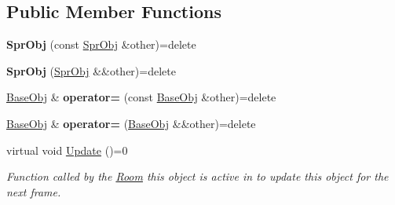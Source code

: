 \subsection*{Public Member Functions}
\begin{DoxyCompactItemize}
\item 
\hypertarget{class_helios_1_1_spr_obj_ab803d71e66b25686f4d6a29c1f3ee0d6}{}{\bfseries Spr\+Obj} (const \hyperlink{class_helios_1_1_spr_obj}{Spr\+Obj} \&other)=delete\label{class_helios_1_1_spr_obj_ab803d71e66b25686f4d6a29c1f3ee0d6}

\item 
\hypertarget{class_helios_1_1_spr_obj_ab0a6136a689b13a5ab16270df52a303a}{}{\bfseries Spr\+Obj} (\hyperlink{class_helios_1_1_spr_obj}{Spr\+Obj} \&\&other)=delete\label{class_helios_1_1_spr_obj_ab0a6136a689b13a5ab16270df52a303a}

\item 
\hypertarget{class_helios_1_1_spr_obj_a89e23d41b2a2b4262ed68b9c81cdbe42}{}\hyperlink{class_helios_1_1_base_obj}{Base\+Obj} \& {\bfseries operator=} (const \hyperlink{class_helios_1_1_base_obj}{Base\+Obj} \&other)=delete\label{class_helios_1_1_spr_obj_a89e23d41b2a2b4262ed68b9c81cdbe42}

\item 
\hypertarget{class_helios_1_1_spr_obj_a99d676eda512fa5dbc026ca6db1bfcb0}{}\hyperlink{class_helios_1_1_base_obj}{Base\+Obj} \& {\bfseries operator=} (\hyperlink{class_helios_1_1_base_obj}{Base\+Obj} \&\&other)=delete\label{class_helios_1_1_spr_obj_a99d676eda512fa5dbc026ca6db1bfcb0}

\item 
\hypertarget{class_helios_1_1_spr_obj_a5ea59f62cf7bb7bd7ff8080a79894037}{}virtual void \hyperlink{class_helios_1_1_spr_obj_a5ea59f62cf7bb7bd7ff8080a79894037}{Update} ()=0\label{class_helios_1_1_spr_obj_a5ea59f62cf7bb7bd7ff8080a79894037}

\begin{DoxyCompactList}\small\item\em Function called by the \hyperlink{class_helios_1_1_room}{Room} this object is active in to update this object for the next frame. \end{DoxyCompactList}\end{DoxyCompactItemize}
